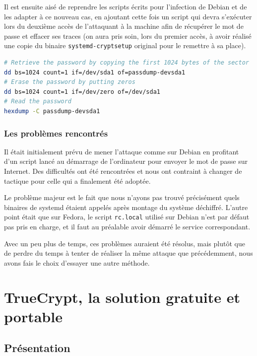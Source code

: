 \documentclass[12pt,a4paper]{article}
\begin{document}
Il est ensuite aisé de reprendre les scripts écrits pour l'infection de Debian et de les adapter à ce nouveau cas, en ajoutant cette fois un script qui devra s'exécuter lors du deuxième accès de l'attaquant à la machine afin de récupérer le mot de passe et effacer ses traces (on aura pris soin, lors du premier accès, à avoir réalisé une copie du binaire \texttt{systemd-cryptsetup} original pour le remettre à sa place).

\begin{lstlisting}[language=Bash]
# Retrieve the password by copying the first 1024 bytes of the sector
dd bs=1024 count=1 if=/dev/sda1 of=passdump-devsda1
# Erase the password by putting zeros
dd bs=1024 count=1 if=/dev/zero of=/dev/sda1
# Read the password
hexdump -C passdump-devsda1
\end{lstlisting}


\subsubsection*{Les problèmes rencontrés}

Il était initialement prévu de mener l'attaque comme sur Debian en profitant d'un script lancé au démarrage de l'ordinateur pour envoyer le mot de passe sur Internet. Des difficultés ont été rencontrées et nous ont contraint à changer de tactique pour celle qui a finalement été adoptée.

Le problème majeur est le fait que nous n'ayons pas trouvé précisément quels binaires de systemd étaient appelés après montage du système déchiffré. L'autre point était que sur Fedora, le script \texttt{rc.local} utilisé sur Debian n'est par défaut pas pris en charge, et il faut au préalable avoir démarré le service correspondant.

Avec un peu plus de temps, ces problèmes auraient été résolus, mais plutôt que de perdre du temps à tenter de réaliser la même attaque que précédemment, nous avons fais le choix d'essayer une autre méthode.


\section{TrueCrypt, la solution gratuite et portable}

\subsection{Présentation}
\end{document}
